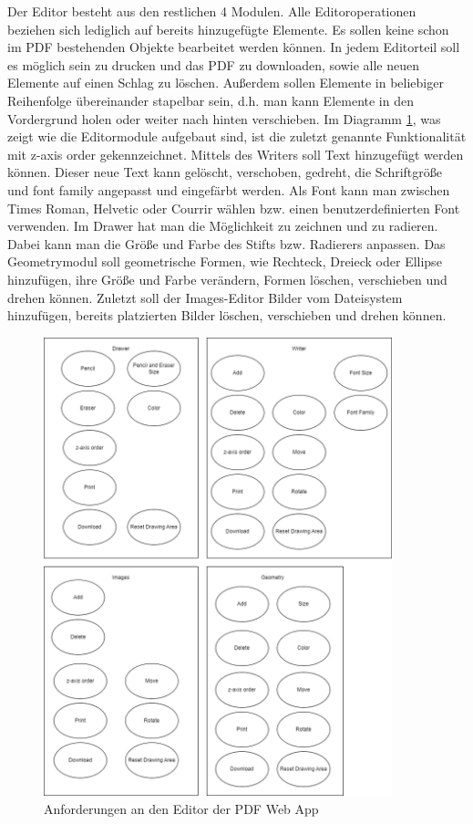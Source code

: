 Der Editor besteht aus den restlichen 4 Modulen. Alle Editoroperationen beziehen sich lediglich auf bereits hinzugefügte Elemente. Es sollen keine schon im PDF bestehenden Objekte bearbeitet werden können. In jedem Editorteil soll es möglich sein zu drucken und das PDF zu downloaden, sowie alle neuen Elemente auf einen Schlag zu löschen. Außerdem sollen Elemente in beliebiger Reihenfolge übereinander stapelbar sein, d.h. man kann Elemente in den Vordergrund holen oder weiter nach hinten verschieben. Im Diagramm \ref{fig:editor}, was zeigt wie die Editormodule aufgebaut sind, ist die zuletzt genannte Funktionalität mit z-axis order gekennzeichnet. Mittels des Writers soll Text hinzugefügt werden können. Dieser neue Text kann gelöscht, verschoben, gedreht, die Schriftgröße und font family angepasst und eingefärbt werden. Als Font kann man zwischen Times Roman, Helvetic oder Courrir wählen bzw. einen benutzerdefinierten Font verwenden. Im Drawer hat man die Möglichkeit zu zeichnen und zu radieren. Dabei kann man die Größe und Farbe des Stifts bzw. Radierers anpassen. Das Geometrymodul soll geometrische Formen, wie Rechteck, Dreieck oder Ellipse hinzufügen, ihre Größe und Farbe verändern, Formen löschen, verschieben und drehen können. Zuletzt soll der Images-Editor Bilder vom Dateisystem hinzufügen, bereits platzierten Bilder löschen, verschieben und drehen können.


\begin{figure}[!htb]
	\centering
	\includegraphics[width=0.9\textwidth]{"images/editor-funktionen-anforderungen.png"}
	\caption{Anforderungen an den Editor der PDF Web App}
	\label{fig:editor}
\end{figure}


